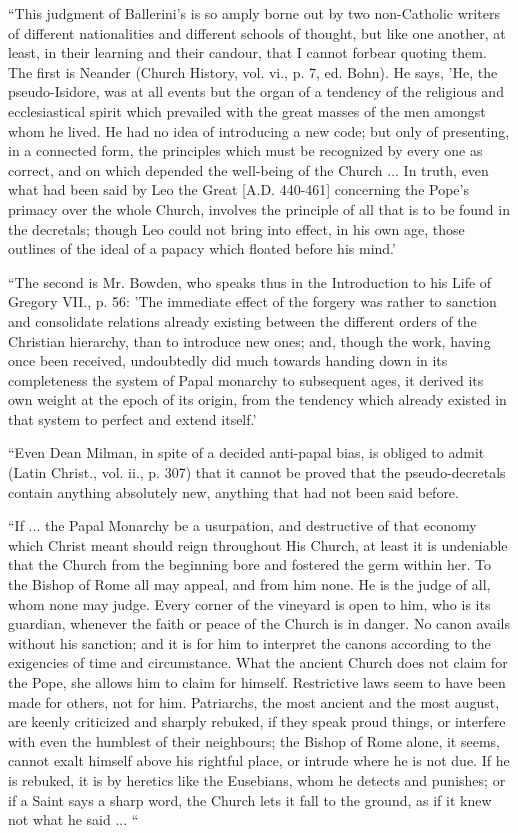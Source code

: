 ``This judgment of Ballerini's is so amply borne
out by two non-Catholic writers of different nationalities and
different schools of thought, but like one another, at least, in their
learning and their candour, that I cannot forbear quoting them. The
first is Neander (Church History, vol. vi., p. 7, ed. Bohn). He says,
'He, the pseudo-Isidore, was at all events but the organ of a tendency
of the religious and ecclesiastical spirit which prevailed with the
great masses of the men amongst whom he lived. He had no idea of
introducing a new code; but only of presenting, in a connected form,
the principles which must be recognized by every one as correct, and
on which depended the well-being of the Church ... In truth, even what
had been said by Leo the Great [A.D.
440-461] concerning the Pope's primacy over the whole Church, involves
the principle of all that is to be found in the decretals; though Leo
could not bring into effect, in his own age, those outlines of the
ideal of a papacy which floated before his mind.'

``The second is Mr. Bowden, who speaks thus in the
Introduction to his Life of Gregory VII., p. 56: 'The immediate effect
of the forgery was rather to sanction and consolidate relations
already existing between the different orders of the Christian
hierarchy, than to introduce new ones; and, though the work, having
once been received, undoubtedly did much towards handing down in its
completeness the system of Papal monarchy to subsequent ages, it
derived its own weight at the epoch of its origin, from the
tendency which already existed in that system to perfect and extend
itself.'

``Even Dean Milman, in spite of a decided
anti-papal bias, is obliged to admit (Latin Christ., vol. ii., p. 307)
that it cannot be proved that the pseudo-decretals contain anything
absolutely new, anything that had not been said before.

``If ... the Papal Monarchy be a usurpation, and
destructive of that economy which Christ meant should reign throughout
His Church, at least it is undeniable that the Church from the
beginning bore and fostered the germ within her. To the Bishop of Rome
all may appeal, and from him none. He is the judge of all, whom none
may judge. Every corner of the vineyard is open to him, who is its
guardian, whenever the faith or peace of the Church is in danger. No
canon avails without his sanction; and it is for him to interpret the
canons according to the exigencies of time and circumstance. What the
ancient Church does not claim for the Pope, she allows him to claim
for himself. Restrictive laws seem to have been made for others, not
for him. Patriarchs, the most ancient and the most august, are keenly
criticized and sharply rebuked, if they speak proud things, or
interfere with even the humblest of their neighbours; the Bishop of
Rome alone, it seems, cannot exalt himself above his rightful place,
or intrude where he is not due. If he is rebuked, it is by heretics
like the Eusebians, whom he detects and punishes; or if a Saint says a
sharp word, the Church lets it fall to the ground, as if it knew not
what he said ... ``

